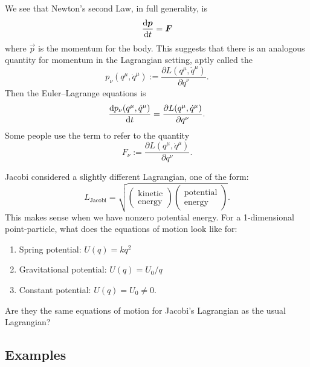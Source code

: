 \label{chunk:lagrange:generalized-momentum}
We see that Newton's second Law, in full generality, is
\begin{equation}
\frac{\mathrm{d}\boldsymbol{p}}{\mathrm{d} t} =\boldsymbol{F}
\end{equation}
where $\vec{p}$ is the momentum for the body. This suggests that there
is an analogous quantity for momentum in the Lagrangian setting, aptly
called the 
\begin{equation}
p_{\nu}(q^{\mu},\dot{q}^{\mu}) := \frac{\partial L(q^{\mu},\dot{q}^{\mu})}{\partial\dot{q}^{\nu}}.
\end{equation}
Then the Euler--Lagrange equations is
\begin{equation}
\frac{\mathrm{d} p_{\nu}(q^{\mu},\dot{q}^{\mu})}{\mathrm{d} t} = \frac{\partial L(q^{\mu},\dot{q}^{\mu})}{\partial q^{\nu}}.
\end{equation}
Some people use the term  to refer to the
quantity
\begin{equation}
F_{\nu} := \frac{\partial L(q^{\mu},\dot{q}^{\mu})}{\partial q^{\nu}}.
\end{equation}

Jacobi considered a slightly different Lagrangian, one of the form:
\begin{equation}
L_{\text{Jacobi}} = \sqrt{\begin{pmatrix}\mbox{kinetic}\\\mbox{energy}\end{pmatrix}\begin{pmatrix}\mbox{potential}\\\mbox{energy}\end{pmatrix}}.
\end{equation}
This makes sense when we have nonzero potential energy. For a
1-dimensional point-particle, what does the equations of motion look
like for:
\begin{enumerate}
\item Spring potential: $U(q)=kq^{2}$
\item Gravitational potential: $U(q) = U_{0}/q$
\item Constant potential: $U(q)=U_{0}\neq0$.
\end{enumerate}
Are they the same equations of motion for Jacobi's Lagrangian as the
usual Lagrangian?

\subsection{Examples}

